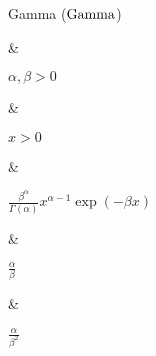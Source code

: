 Gamma ($\operatorname{Gamma}$)

&

$\alpha, \beta > 0$

& 

$x > 0$

&

\(\displaystyle
	\frac{\beta^{\alpha}}{\Gamma(\alpha)} x^{\alpha - 1} \exp(-\beta x)
\)

& 

$\frac{\alpha}{\beta}$

&

$\frac{\alpha}{\beta^2}$